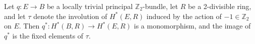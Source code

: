 Let $q: E \rightarrow B$ be a locally trivial principal $\mathbb{Z}_2$-bundle, let $R$ be a 2-divisible ring, and let $\tau$ denote the involution of $H^*(E, R)$ induced by the action of $-1 \in \mathbb{Z}_2$ on $E$. Then $q^*: H^*(B, R) \rightarrow H^*(E, R)$ is a monomorphism, and the image of $q^*$ is the fixed elements of $\tau$.
